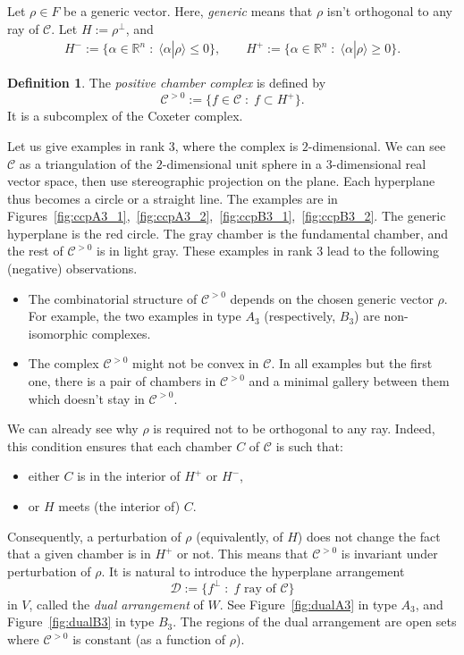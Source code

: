 \documentclass[11pt]{article}
\theoremstyle{definition}
\newtheorem{defi}[theo]{Definition}
\newcommand{\CC}{\mathcal{C}}
\newcommand{\DD}{\mathcal{D}}
\newcommand{\CCP}{\mathcal{C}^{>0}}
\begin{document}
Let $\rho \in F$ be a generic vector.  Here, {\it generic} means that $\rho$ isn't orthogonal to any ray of $\CC$.  Let $H := \rho^{\perp}$, and
\begin{align} \label{def:H}
    H^- := \big\{ \alpha \in \mathbb{R}^n \;:\; \langle \alpha | \rho \rangle \leq 0 \big\},  
    \qquad
    H^+ := \big\{ \alpha \in \mathbb{R}^n \;:\; \langle \alpha | \rho \rangle \geq 0 \big\}.
\end{align}

\begin{defi}
    The {\it positive chamber complex} is defined by
    \[
        \CCP :=
        \{
            f \in \CC \;:\; f \subset H^+
        \}.
    \]
    It is a subcomplex of the Coxeter complex. 
\end{defi}

Let us give examples in rank 3, where the complex is $2$-dimensional.  We can see $\CC$ as a triangulation of the $2$-dimensional unit sphere in a $3$-dimensional real vector space, then use stereographic projection on the plane. Each hyperplane thus becomes a circle or a straight line.  The examples are in Figures~\ref{fig:ccpA3_1},~\ref{fig:ccpA3_2},~\ref{fig:ccpB3_1},~\ref{fig:ccpB3_2}.
The generic hyperplane is the red circle.  The gray chamber is the fundamental chamber, and the rest of $\CCP$ is in light gray.  These examples in rank 3 lead to the following (negative) observations.
\begin{itemize}
    \item The combinatorial structure of $\CCP$ depends on the chosen generic vector $\rho$.  For example, the two examples in type $A_3$ (respectively, $B_3$) are non-isomorphic complexes. 
    \item The complex $\CCP$ might not be convex in $\CC$.  In all examples but the first one, there is a pair of chambers in $\CCP$ and a minimal gallery between them which doesn't stay in $\CCP$.
\end{itemize}


We can already see why $\rho$ is required not to be orthogonal to any ray.  Indeed, this condition ensures that each chamber $C$ of $\CC$ is such that: 
\begin{itemize}
    \item either $C$ is in the interior of $H^+$ or $H^-$, 
    \item or $H$ meets (the interior of) $C$. 
\end{itemize}
Consequently, a perturbation of $\rho$ (equivalently, of $H$) does not change the fact that a given chamber is in $H^+$ or not.  This means that $\CCP$ is invariant under perturbation of $\rho$.  It is natural to introduce the hyperplane arrangement
\[
    \DD := \Big\{ f^\perp \;:\; f \text{ ray of } \CC \Big\}
\]
in $V$, called the {\it dual arrangement} of $W$.  See Figure~\ref{fig:dualA3} in type $A_3$, and Figure~\ref{fig:dualB3} in type $B_3$.  The regions of the dual arrangement are open sets where $\CCP$ is constant (as a function of $\rho$).  
\end{document}
